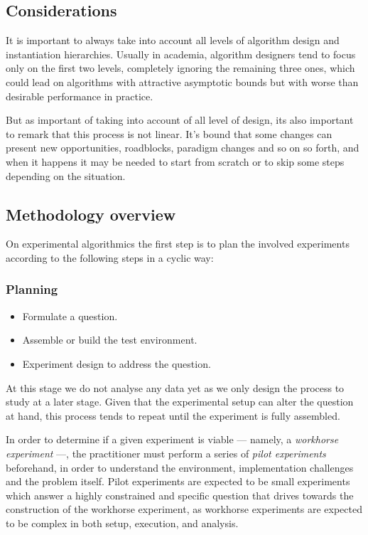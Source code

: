 \subsection{Considerations}
\label{SUBSECTION:EXPERIMENTAL_ALGORITMICS_CONSIDERATIONS}
It is important to always take into account all levels of algorithm design and instantiation hierarchies. Usually in academia, algorithm designers tend to focus only on the first two levels, completely ignoring the remaining three ones, which could lead on algorithms with attractive asymptotic bounds but with worse than desirable performance in practice.

But as important of taking into account of all level of design, its also important to remark that this process is not linear. It's bound that some changes can present new opportunities, roadblocks, paradigm changes and so on so forth, and when it happens it may be needed to start from scratch or to skip some steps depending on the situation.


\subsection{Methodology overview}

On experimental algorithmics the first step is to plan the involved experiments according to the following steps in a cyclic way:

\subsubsection{Planning}
\begin{itemize}
    \item Formulate a question.
    \item Assemble or build the test environment.
    \item Experiment design to address the question.
\end{itemize}

At this stage we do not analyse any data yet as we only design the process to study at a later stage. Given that the experimental setup can alter the question at hand, this process tends to repeat until the experiment is fully assembled.

In order to determine if a given experiment is viable --- namely, a \emph{workhorse experiment} ---, the practitioner must perform a series of \emph{pilot experiments} beforehand, in order to understand the environment, implementation challenges and the problem itself. Pilot experiments are expected to be small experiments which answer a highly constrained and specific question that drives towards the construction of the workhorse experiment, as workhorse experiments are expected to be complex in both setup, execution, and analysis.

